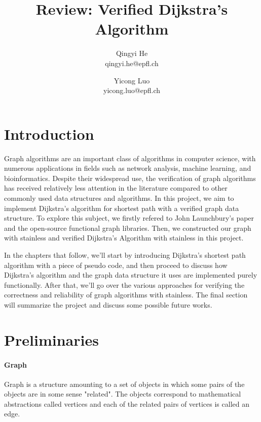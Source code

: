 \documentclass[11pt,a4paper]{article}
\title{Review: Verified Dijkstra's Algorithm}
\author{Qingyi He \\ qingyi.he@epfl.ch \and Yicong Luo\\yicong.luo@epfl.ch}
\begin{document}
\maketitle

\section{Introduction}

Graph algorithms are an important class of algorithms in computer science, with numerous applications in fields such as network analysis, machine learning, and bioinformatics. Despite their widespread use, the verification of graph algorithms has received relatively less attention in the literature compared to other commonly used data structures and algorithms. In this project, we aim to implement Dijkstra's algorithm for shortest path with a verified graph data structure. 
To explore this subject, we firstly refered to John Launchbury’s paper
\cite{10.1007/3-540-59451-5_9} and the open-source functional graph libraries. Then, we constructed our graph with stainless and verified Dijkstra’s Algorithm with stainless in this project. 

In the chapters that follow, we'll start by introducing Dijkstra's shortest path algorithm with a piece of pseudo code, and then proceed to discuss how Dijkstra's algorithm and the graph data structure it uses are implemented purely functionally. After that, we'll go over the various approaches for verifying the correctness and reliability of graph algorithms with stainless. The final section will summarize the project and discuss some possible future works. 

\section{Preliminaries}

\paragraph{Graph}
Graph is a structure amounting to a set of objects in which some pairs of the objects are in some sense "related". The objects correspond to mathematical abstractions called vertices and each of the related pairs of vertices is called an edge\cite{enwiki:1132329416}. 
\end{document}
